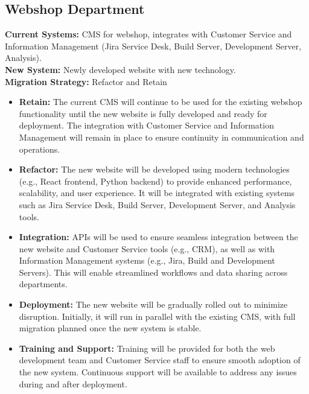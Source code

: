 \subsection{Webshop Department}
\textbf{Current Systems:} CMS for webshop, integrates with Customer Service and Information Management (Jira Service Desk, Build Server, Development Server, Analysis). \\
\textbf{New System:} Newly developed website with new technology. \\
\textbf{Migration Strategy:} Refactor and Retain
\begin{itemize}
    \item \textbf{Retain:} The current CMS will continue to be used for the existing webshop functionality until the new website is fully developed and ready for deployment. The integration with Customer Service and Information Management will remain in place to ensure continuity in communication and operations.
    \item \textbf{Refactor:} The new website will be developed using modern technologies (e.g., React frontend, Python backend) to provide enhanced performance, scalability, and user experience. It will be integrated with existing systems such as Jira Service Desk, Build Server, Development Server, and Analysis tools.
    \item \textbf{Integration:} APIs will be used to ensure seamless integration between the new website and Customer Service tools (e.g., CRM), as well as with Information Management systems (e.g., Jira, Build and Development Servers). This will enable streamlined workflows and data sharing across departments.
    \item \textbf{Deployment:} The new website will be gradually rolled out to minimize disruption. Initially, it will run in parallel with the existing CMS, with full migration planned once the new system is stable.
    \item \textbf{Training and Support:} Training will be provided for both the web development team and Customer Service staff to ensure smooth adoption of the new system. Continuous support will be available to address any issues during and after deployment.
\end{itemize}

